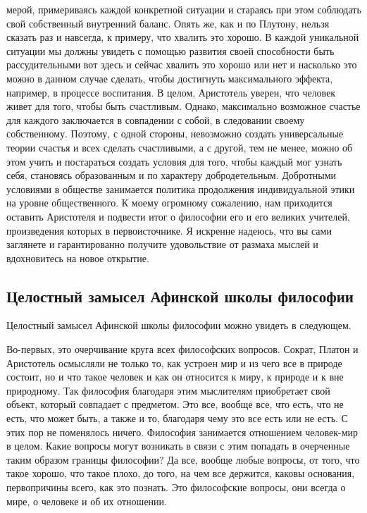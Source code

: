 мерой, примериваясь каждой конкретной ситуации и стараясь при этом соблюдать
свой собственный внутренний баланс. Опять же, как и по Плутону, нельзя сказать
раз и навсегда, к примеру, что хвалить это хорошо. В каждой уникальной ситуации
мы должны увидеть с помощью развития своей способности быть рассудительными вот
здесь и сейчас хвалить это хорошо или нет и насколько это можно в данном случае
сделать, чтобы достигнуть максимального эффекта, например, в процессе
воспитания. В целом, Аристотель уверен, что человек живет для того, чтобы быть
счастливым. Однако, максимально возможное счастье для каждого заключается в
совпадении с собой, в следовании своему собственному. Поэтому, с одной стороны,
невозможно создать универсальные теории счастья и всех сделать счастливыми, а с
другой, тем не менее, можно об этом учить и постараться создать условия для
того, чтобы каждый мог узнать себя, становясь образованным и по характеру
добродетельным. Добротными условиями в обществе занимается политика продолжения
индивидуальной этики на уровне общественного. К моему огромному сожалению, нам
приходится оставить Аристотеля и подвести итог о философии его и его великих
учителей, произведения которых в первоисточнике. Я искренне надеюсь, что вы сами
заглянете и гарантированно получите удовольствие от размаха мыслей и
вдохновитесь на новое открытие. 

\subsection{Целостный замысел Афинской школы философии}

Целостный замысел Афинской школы философии можно увидеть в следующем. 

Во-первых, это очерчивание
круга всех философских вопросов. Сократ, Платон и Аристотель осмысляли не только
то, как устроен мир и из чего все в природе состоит, но и что такое человек и
как он относится к миру, к природе и к вне природному. Так философия благодаря
этим мыслителям приобретает свой объект, который совпадает с предметом. Это все,
вообще все, что есть, что не есть, что может быть, а также и то, благодаря чему
это все есть или не есть. С этих пор не поменялось ничего. Философия занимается
отношением человек-мир в целом. Какие вопросы могут возникать в связи с этим
попадать в очерченные таким образом границы философии? Да все, вообще любые
вопросы, от того, что такое хорошо, что такое плохо, до того, на чем все
держится, каковы основания, первопричины всего, как это познать. Это философские
вопросы, они всегда о мире, о человеке и об их отношении. 

